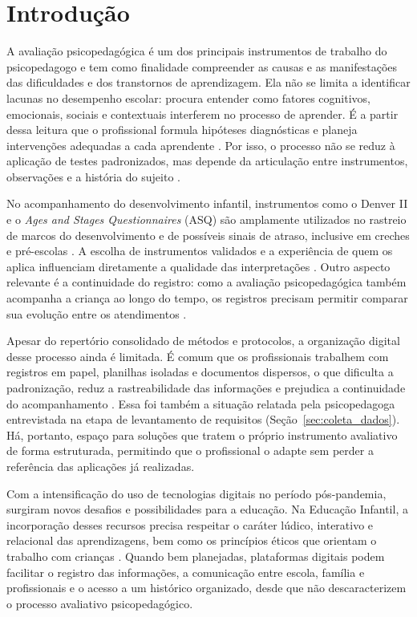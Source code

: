 \chapter[Introdução]{Introdução}\label{capitulo1}

A avaliação psicopedagógica é um dos principais instrumentos de trabalho do psicopedagogo e tem como finalidade compreender as causas e as manifestações das dificuldades e dos transtornos de aprendizagem. Ela não se limita a identificar lacunas no desempenho escolar: procura entender como fatores cognitivos, emocionais, sociais e contextuais interferem no processo de aprender. É a partir dessa leitura que o profissional formula hipóteses diagnósticas e planeja intervenções adequadas a cada aprendente \cite{Santos_Silva_2020}. Por isso, o processo não se reduz à aplicação de testes padronizados, mas depende da articulação entre instrumentos, observações e a história do sujeito \cite{tavares2022_instrumentos_psicopedagogicos}.

No acompanhamento do desenvolvimento infantil, instrumentos como o Denver II e o \textit{Ages and Stages Questionnaires} (ASQ) são amplamente utilizados no rastreio de marcos do desenvolvimento e de possíveis sinais de atraso, inclusive em creches e pré-escolas \cite{Rezende_Costa_Pontes_2005, Ramos_DellaBarba_2021}. A escolha de instrumentos validados e a experiência de quem os aplica influenciam diretamente a qualidade das interpretações \cite{recima2024_instrumentos}. Outro aspecto relevante é a continuidade do registro: como a avaliação psicopedagógica também acompanha a criança ao longo do tempo, os registros precisam permitir comparar sua evolução entre os atendimentos \cite{Santos_Silva_2020}.

Apesar do repertório consolidado de métodos e protocolos, a organização digital desse processo ainda é limitada. É comum que os profissionais trabalhem com registros em papel, planilhas isoladas e documentos dispersos, o que dificulta a padronização, reduz a rastreabilidade das informações e prejudica a continuidade do acompanhamento \cite{anpae2024_avaliacao_educacao_infantil}. Essa foi também a situação relatada pela psicopedagoga entrevistada na etapa de levantamento de requisitos (Seção~\ref{sec:coleta_dados}). Há, portanto, espaço para soluções que tratem o próprio instrumento avaliativo de forma estruturada, permitindo que o profissional o adapte sem perder a referência das aplicações já realizadas.

Com a intensificação do uso de tecnologias digitais no período pós-pandemia, surgiram novos desafios e possibilidades para a educação. Na Educação Infantil, a incorporação desses recursos precisa respeitar o caráter lúdico, interativo e relacional das aprendizagens, bem como os princípios éticos que orientam o trabalho com crianças \cite{Domingues_Kresciglova_Paschoal_Furlan_2023}. Quando bem planejadas, plataformas digitais podem facilitar o registro das informações, a comunicação entre escola, família e profissionais e o acesso a um histórico organizado, desde que não descaracterizem o processo avaliativo psicopedagógico.

